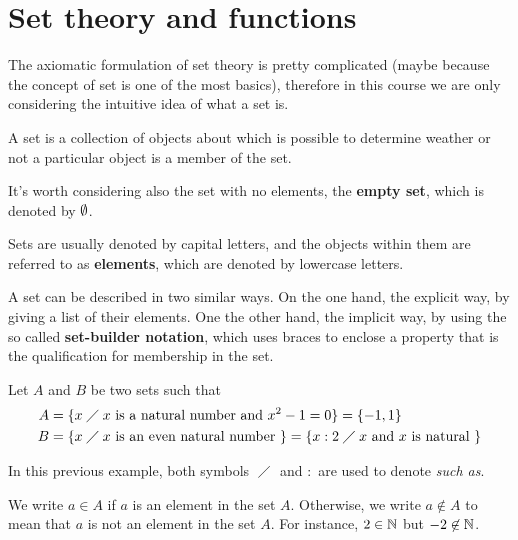 \chapter{Set theory and functions}
The axiomatic formulation of set theory is pretty complicated (maybe because the concept of set is one of the most basics), therefore in this course we are only considering the intuitive idea of what a set is.


\begin{defi}[Set]
    A set is a collection of objects about which is possible to determine weather or not a particular object is a member of the set.
\end{defi}

\begin{note}
    It's worth considering also the set with no elements, the \textbf{empty set}, which is denoted by $\emptyset$.
\end{note}

Sets are usually denoted by capital letters, and the objects within them are referred to as \textbf{elements}, which are denoted by lowercase letters.

A set can be described in two similar ways. On the one hand, the explicit way, by giving a list of their elements. One the other hand, the implicit way, by using the so called \textbf{set-builder notation}, which uses braces to enclose a property that is the qualification for membership in the set.

\begin{example}
    Let $A$ and $B$ be two sets such that
    \begin{align}
        A &= \lbrace x\;\diagup\; x \textrm{ is a natural number and } x^2 - 1 = 0 \rbrace = \lbrace -1, 1\rbrace \\
        B &= \lbrace x\;\diagup\; x \textrm{ is an even natural number } \rbrace = \lbrace x : 2\;\diagup\; x \textrm{ and $x$ is natural } \rbrace
    \end{align}
\end{example}

\begin{notation}
    In this previous example, both symbols $\;\diagup\;$ and $ : $ are used to denote \textit{such as}.
\end{notation}

We write $a\in A$ if $a$ is an element in the set $A$. Otherwise, we write $a\notin A$ to mean that $a$ is not an element in the set $A$. For instance, $2\in\mathbb{N}$ but $-2\not\in \mathbb{N}$.

